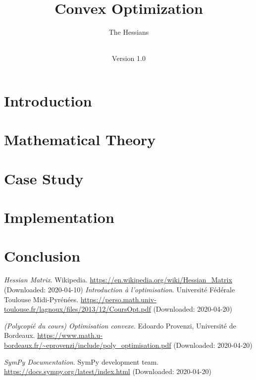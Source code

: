 \documentclass[notitlepage]{article}
\title{Convex Optimization\\}
\author{The Hessians}
\date{\documentdate\\Version 1.0} %
\begin{document}
\maketitle
\projectidentity
\authors

\newpage
\tableofcontents

\newpage
{}

\section{Introduction}

\newpage

\section{Mathematical Theory}

\newpage

\section{Case Study}

\newpage

\section{Implementation}

\newpage

\section{Conclusion}

\newpage

\begin{thebibliography}{9}

	\textit{Hessian Matrix}.
	Wikipedia.
	\url{https://en.wikipedia.org/wiki/Hessian_Matrix} (Downloaded: 2020-04-10)
    \textit{Introduction à l'optimisation}.
    Université Fédérale Toulouse Midi-Pyrénées.
    \url{https://perso.math.univ-toulouse.fr/lagnoux/files/2013/12/CoursOpt.pdf} (Downloaded: 2020-04-20)

    \textit{(Polycopié du cours) Optimisation convexe}.
    Edoardo Provenzi, Université de Bordeaux.
    \url{https://www.math.u-bordeaux.fr/~eprovenzi/include/poly_optimisation.pdf} (Downloaded: 2020-04-20)

    \textit{SymPy Documentation}.
    SymPy development team.
    \url{https://docs.sympy.org/latest/index.html} (Downloaded: 2020-04-20)

\end{thebibliography}
\end{document}
